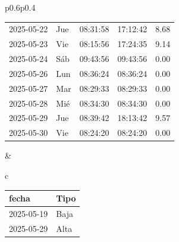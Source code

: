 \documentclass[11pt,a4paper]{article}
\newcommand{\infobox}[2]{
  \begin{tcolorbox}[
    colback=grisclaro,
    colframe=corporativo,
    title=#1,
    fonttitle=\bfseries
  ]
#2
  \end{tcolorbox}
}
\begin{document}
\begin{tabular}{p{}p{}}
{\begin{tabular}{p{2cm} p{0.6cm} p{1.2cm} p{1.2cm} r}
2025-05-22 & Jue & 08:31:58 & 17:12:42 &8.68\\
\rowcolor{white}%
2025-05-23 & Vie & 08:15:56 & 17:24:35 &9.14\\
\rowcolor{jornadacero!20}%
\rowcolor{corporativo!20}
 2025-05-24  &  Sáb  &  09:43:56  &  09:43:56  &%
         \textcolor{jornadacero}{ 0.00 }\\
\rowcolor{jornadacero!20}%
2025-05-26 & Lun & 08:36:24 & 08:36:24 &\textcolor{jornadacero}{ 0.00 }\\
\rowcolor{jornadacero!20}%
2025-05-27 & Mar & 08:29:33 & 08:29:33 &\textcolor{jornadacero}{ 0.00 }\\
\rowcolor{jornadacero!20}%
2025-05-28 & Mié & 08:34:30 & 08:34:30 &\textcolor{jornadacero}{ 0.00 }\\
\rowcolor{white}%
2025-05-29 & Jue & 08:39:42 & 18:13:42 &9.57\\
\rowcolor{jornadacero!20}%
2025-05-30 & Vie & 08:24:20 & 08:24:20 &\textcolor{jornadacero}{ 0.00 }\\

\bottomrule
\end{tabular}
}
&
\begin{tabular}{c}

\infobox{D\'ias At\'ipicos}{
\begin{tabular}{p{2cm} p{2cm}}
\toprule
\rowcolor{grisclaro} \textbf{fecha} & \textbf{Tipo}\\
\midrule

2025-05-19 & Baja\\

2025-05-29 & Alta\\

\bottomrule
\end{tabular}
}
\\
\\




    

    

    

    

    

    


\end{tabular}
\end{tabular}
\end{document}
